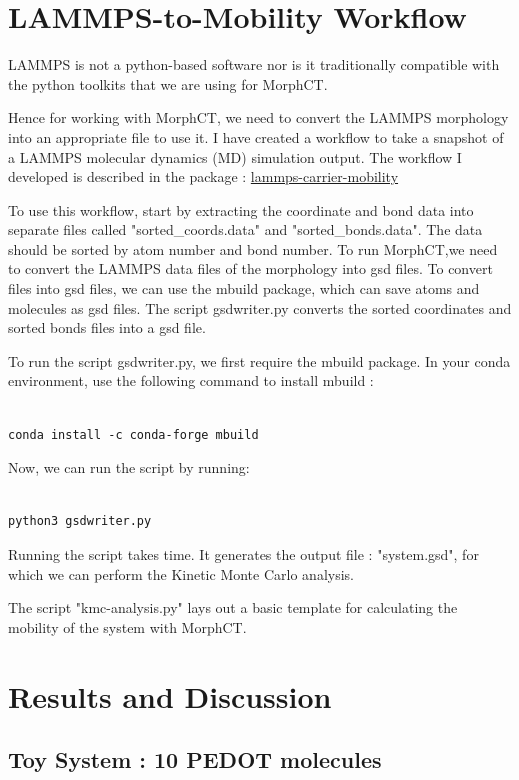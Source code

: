 \documentclass{article}
\begin{document}
\section{LAMMPS-to-Mobility Workflow}

LAMMPS is not a python-based software nor is it traditionally compatible with the python toolkits that we are using for MorphCT.

Hence for working with MorphCT, we need to convert the LAMMPS morphology into an appropriate file to use it. I have created a workflow to take a snapshot of a LAMMPS molecular dynamics (MD) simulation output. The workflow I developed is described in the package : \href{https://github.com/chemicalfiend/lammps-carrier-mobility}{lammps-carrier-mobility}

To use this workflow, start by extracting the coordinate and bond data into separate files called "sorted\_coords.data" and "sorted\_bonds.data". The data should be sorted by atom number and bond number. To run MorphCT,we need to convert the LAMMPS data files of the morphology into gsd files. To convert files into gsd files, we can use the mbuild package, which can save atoms and molecules as gsd files. The script gsdwriter.py converts the sorted coordinates and sorted bonds files into a gsd file. 

To run the script gsdwriter.py, we first require the mbuild package. In your conda environment, use the following command to install mbuild :

\begin{lstlisting}

conda install -c conda-forge mbuild

\end{lstlisting}

Now, we can run the script by running:

\begin{lstlisting}

python3 gsdwriter.py

\end{lstlisting}


Running the script takes time. It generates the output file : "system.gsd", for which we can perform the Kinetic Monte Carlo analysis.

The script "kmc-analysis.py" lays out a basic template for calculating the mobility of the system with MorphCT.


\section{Results and Discussion}

\subsection{Toy System : 10 PEDOT molecules}


\end{document}
